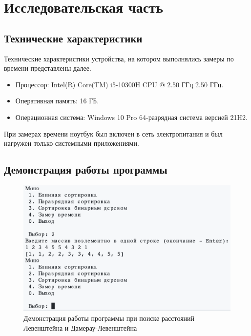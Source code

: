 \chapter{Исследовательская часть}

\section{Технические характеристики}

Технические характеристики устройства, на котором выполнялись замеры по времени представлены далее.

\begin{itemize}
	\item Процессор: Intel(R) Core(TM) i5-10300H CPU @ 2.50 ГГц 2.50 ГГц. \cite{intel}
	\item Оперативная память: 16 ГБ.
	\item Операционная система: Windows 10 Pro 64-разрядная система версией 21H2. \cite{windows}
\end{itemize}

При замерах времени ноутбук был включен в сеть электропитания и был нагружен только системными приложениями.

\section{Демонстрация работы программы}

\begin{figure}[h]
	\centering
	\includegraphics[height=0.4\textheight]{img/example.png}
	\caption{Демонстрация работы программы при поиске расстояний Левенштейна и Дамерау-Левенштейна}
	\label{img:demonstration}
\end{figure}


